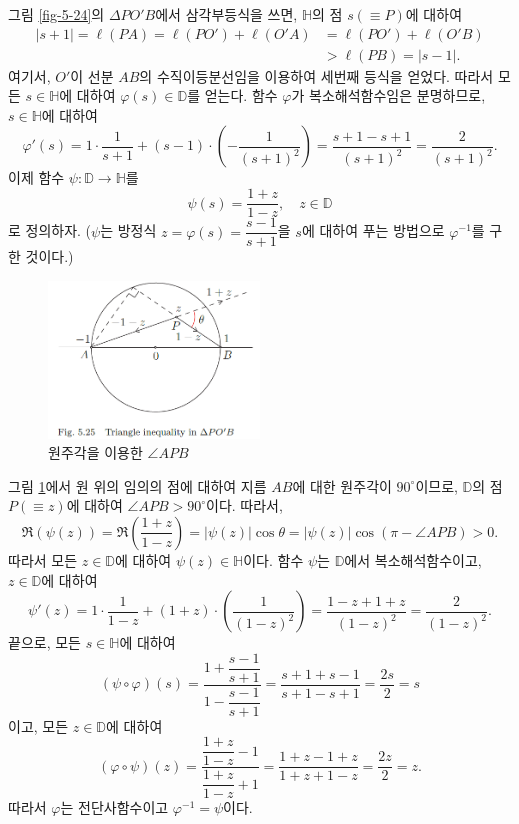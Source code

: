 \begin{itemize}
그림 \ref{fig-5-24}의 $\Delta PO'B$에서 삼각부등식을 쓰면,
$\mathbb H$의 점 $s(\equiv P)$에 대하여
\begin{align*}
|s+1| = \ell(PA) = \ell(PO') + \ell(O'A)
&= \ell(PO') + \ell (O'B) \\
&> \ell(PB) = |s-1|.
\end{align*}
여기서, $O'$이 선분  $AB$의 수직이등분선임을 이용하여
세번째 등식을 얻었다.
따라서 모든 $s\in\mathbb H$에 대하여 $\varphi(s)\in \mathbb D$를 얻는다.
함수 $\varphi$가 복소해석함수임은 분명하므로, $s\in\mathbb H$에  대하여
\[
\varphi'(s) = 1\cdot \dfrac1{s+1} + (s-1)\cdot
\left( - \dfrac1{(s+1)^2} \right) = \dfrac{s+1-s+1}{(s+1)^2}
= \dfrac2{(s+1)^2}.
\]
이제 함수  $\psi: \mathbb D \to \mathbb H$를
\[
\psi(s) = \dfrac{1+z}{1-z}, \quad z\in\mathbb D
\]
로 정의하자.
($\psi$는
방정식 $z= \varphi(s) = \dfrac{s-1}{s+1}$을 $s$에 대하여 푸는 방법으로
$\varphi^{-1}$를 구한 것이다.)

\begin{figure}[h!]
\begin{center}
\includegraphics[width=0.5\textwidth]{./Solution/figs/fig-5-25}
\end{center}
\caption{원주각을 이용한 $\angle APB$
}
\label{fig-5-25}
\end{figure}

그림 \ref{fig-5-25}에서 원 위의 임의의 점에 대하여
지름 $AB$에 대한 원주각이 $90^\circ$이므로,
$\mathbb D$의 점 $P(\equiv z)$에 대하여
$\angle APB >90^\circ$이다. 따라서,
\[
\Re(\psi(z)) = \Re\left( \dfrac{1+z}{1-z} \right)
= |\psi(z)| \cos\theta = |\psi(z)| \cos(\pi - \angle APB) >0.
\]
따라서 모든 $z\in \mathbb D$에 대하여 $\psi(z)\in \mathbb H$이다.
함수 $\psi$는 $\mathbb D$에서 복소해석함수이고, $z\in\mathbb D$에 대하여
\[
\psi'(z) = 1\cdot \dfrac1{1-z} + (1+z)\cdot \left(\dfrac1{(1-z)^2}\right)
= \dfrac{1-z+1+z}{(1-z)^2} = \dfrac2{(1-z)^2}.
\]
끝으로, 모든 $s\in\mathbb H$에 대하여
\[
(\psi\circ \varphi)(s) = \dfrac{1+\dfrac{s-1}{s+1}}{1-\dfrac{s-1}{s+1}}
= \dfrac{s+1+s-1}{s+1-s+1} = \dfrac{2s}2 = s
\]
이고, 모든 $z\in\mathbb D$에 대하여 
\[
(\varphi\circ\psi)(z) = \dfrac{\dfrac{1+z}{1-z}-1}{\dfrac{1+z}{1-z}+1}
= \dfrac{1+z-1+z}{1+z+1-z} = \dfrac{2z}2 = z.
\]
따라서 $\varphi$는 전단사함수이고 $\varphi^{-1}=\psi$이다.


\end{itemize}
